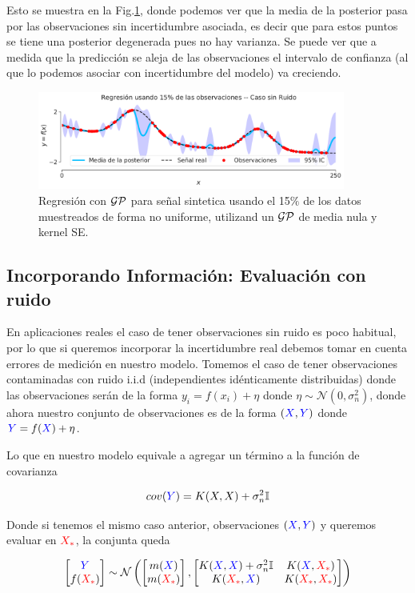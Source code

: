 Esto se muestra en la Fig.\ref{fig:gp_2}, donde podemos ver que la media de la posterior pasa por las observaciones sin incertidumbre asociada, es decir que para estos puntos se tiene una posterior degenerada pues no hay varianza. Se puede ver que a medida que la predicción se aleja de las observaciones el intervalo de confianza (al que lo podemos asociar con incertidumbre del modelo) va creciendo.

\begin{figure}[H]
	\centering
	\includegraphics[width=0.9\textwidth]{img/cap6_gp_posterior_no_ruido}
	\caption{Regresión con $\mathcal{GP}$ para señal sintetica usando el 15$\%$ de los datos muestreados de forma no uniforme, utilizand un $\mathcal{GP}$ de media nula y kernel SE.} 
	\label{fig:gp_2}
\end{figure}

\subsection{Incorporando Información: Evaluación con ruido}

En aplicaciones reales el caso de tener observaciones sin ruido es poco habitual, por lo que si queremos incorporar la incertidumbre real debemos tomar en cuenta errores de medición en nuestro modelo. Tomemos el caso de tener observaciones contaminadas con ruido i.i.d (independientes idénticamente distribuidas) donde las observaciones serán de la forma $y_i = f(x_i) + \eta$ donde $\eta \sim \mathcal{N}(0, \sigma_n^2)$, donde ahora nuestro conjunto de observaciones es de la forma $(\textcolor{blue}{X}, \textcolor{blue}{Y})$ donde $\textcolor{blue}{Y}=f(\textcolor{blue}{X}) + \eta$.

Lo que en nuestro modelo equivale a agregar un término a la función de covarianza

\begin{equation}
	cov(\textcolor{blue}{Y}) = K(X, X) + \sigma_n^2{\mathbb I}
\end{equation}

Donde si tenemos el mismo caso anterior, observaciones $(\textcolor{blue}{X}, \textcolor{blue}{Y})$ y queremos evaluar en $\textcolor{red}{X_*}$, la conjunta queda


\begin{align}
	\begin{bmatrix} \textcolor{blue}{Y} \\ f(\textcolor{red}{X_*})  \end{bmatrix}
	\sim \mathcal{N} \left(
	\begin{bmatrix} m(\textcolor{blue}{X}) \\ m(\textcolor{red}{X_*})  \end{bmatrix}, 
	\begin{bmatrix}
		K(\textcolor{blue}{X}, \textcolor{blue}{X}) + \sigma_n^2 {\mathbb I} & K(\textcolor{blue}{X}, \textcolor{red}{X_*}) \\ K(\textcolor{red}{X_*}, \textcolor{blue}{X}) & K(\textcolor{red}{X_*}, \textcolor{red}{X_*})
	\end{bmatrix}
	 \right)
\end{align}

